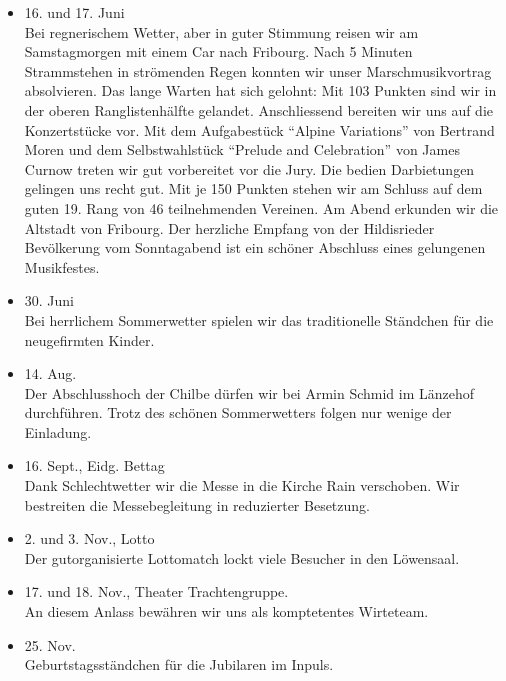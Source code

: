\begin{history}
\begin{itemize}
        \item[]16. und 17. Juni\\
        Bei regnerischem Wetter, aber in guter Stimmung reisen wir am
        Samstagmorgen mit einem Car nach Fribourg. Nach 5 Minuten Strammstehen
        in strömenden Regen konnten wir unser Marschmusikvortrag absolvieren.
        Das lange Warten hat sich gelohnt: Mit 103 Punkten sind wir in der
        oberen Ranglistenhälfte gelandet. Anschliessend bereiten wir uns auf die
        Konzertstücke vor. Mit dem Aufgabestück \enquote{Alpine Variations} von
        Bertrand Moren und dem Selbstwahlstück \enquote{Prelude and Celebration}
        von James Curnow treten wir gut vorbereitet vor die Jury. Die bedien
        Darbietungen gelingen uns recht gut. Mit je 150 Punkten stehen wir am
        Schluss auf dem guten 19. Rang von 46 teilnehmenden Vereinen. Am Abend
        erkunden wir die Altstadt von Fribourg. Der herzliche Empfang von der
        Hildisrieder Bevölkerung vom Sonntagabend ist ein schöner Abschluss
        eines gelungenen Musikfestes.

        \item[]30. Juni\\
        Bei herrlichem Sommerwetter spielen wir das traditionelle Ständchen für
        die neugefirmten Kinder.

        \item[]14. Aug.\\
        Der Abschlusshoch der Chilbe dürfen wir bei Armin Schmid im Länzehof
        durchführen. Trotz des schönen Sommerwetters folgen nur wenige der
        Einladung.

        \item[]16. Sept., Eidg. Bettag\\
        Dank Schlechtwetter wir die Messe in die Kirche Rain verschoben. Wir
        bestreiten die Messebegleitung in reduzierter Besetzung.

        \item[]2. und 3. Nov., Lotto\\
        Der gutorganisierte Lottomatch lockt viele Besucher in den Löwensaal.

        \item[]17. und 18. Nov., Theater Trachtengruppe.\\
        An diesem Anlass bewähren wir uns  als komptetentes Wirteteam.

        \item[]25. Nov.\\
        Geburtstagsständchen für die Jubilaren im Inpuls.


    \end{itemize}

\end{history}
